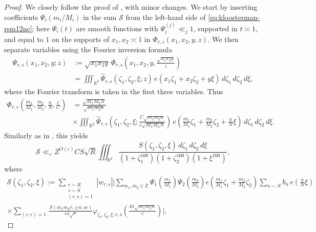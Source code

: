 \documentclass[reqno,11pt]{amsart}
\theoremstyle{remark}
\numberwithin{equation}{section}
\newcommand{\Z}{\mathbb{Z}}
\newcommand{\R}{\mathbb{R}}
\newcommand{\mS}{\mathcal{S}}
\newcommand{\eps}{\varepsilon}
\renewcommand{\bar}{\overline}
\renewcommand{\hat}{\widehat}
\begin{document}
\begin{proof}
We closely follow the proof of \cite[Corollary 17]{pascadi2023smooth}, with minor changes.
We start by inserting coefficients $\Psi_i(m_i/M_i)$ in the sum $\mS$ from the left-hand side of \cref{eq:kloosterman-rsm12nc}; here $\Psi_i(t)$ are smooth functions with $\Psi_i^{(j)} \ll_j 1$, supported in $t \asymp 1$, and equal to $1$ on the supports of $x_1, x_2 \asymp 1$ in $\Phi_{r,s}(x_1, x_2, y, z)$. We then separate variables using the Fourier inversion formula 
\[
\begin{aligned}
    \Psi_{r,s}(x_1, x_2, y; z)
    &:= 
    \sqrt{x_1 x_2 y}\,\Phi_{r,s}\left(x_1, x_2, y, \frac{\sqrt{x_1 x_2 y}}{z} \right) \\
    &= 
    \iiint_{\R^3} \hat{\Psi}_{r,s}(\zeta_1, \zeta_2, \xi; z) \, e(x_1\zeta_1 + x_2\zeta_2 + y\xi)\, d\zeta_1\, d\zeta_2\, d\xi,
\end{aligned}
\]
where the Fourier transform is taken in the first three variables. Thus
\[
\begin{aligned}
    \Phi_{r,s}\left(\frac{m_1}{M_1}, \frac{m_2}{M_2}, \frac{n}{N}, \frac{c}{C}\right)
    &=
    \frac{\sqrt{M_1M_2N}}{\sqrt{m_1m_2n}}
    \\
    &\times 
    \iiint_{\R^2} \hat{\Psi}_{r,s}\left(\zeta_1, \zeta_2, \xi; \frac{C\sqrt{m_1m_2n}}{c\sqrt{M_1M_2N}}\right) \, e\left(\frac{m_1}{M_1}\zeta_1 + \frac{m_2}{M_2}\zeta_2 + \frac{n}{N}\xi\right)\, d\zeta_1\, d\zeta_2\, d\xi.
\end{aligned}
\]
Similarly as in \cite[(5.21)]{pascadi2024large}, this yields
\begin{equation} \label{eq:final-kloosterman-integral}
    \mS \ll_\eps Z^{O(\eps)} CS\sqrt{R} \iiint_{\R^2} \frac{S(\zeta_1, \zeta_2, \xi)\, d\zeta_1\, d\zeta_2\, d\xi}{(1 + \zeta_1^{100}) (1 + \zeta_2^{100}) (1 + \xi^{100})},
\end{equation}
where
\[
\begin{aligned}
    \mS(\zeta_1, \zeta_2, \xi) := \sum_{\substack{r \sim R \\ s \sim S \\ (r, s) = 1}} |w_{r,s}| \Bigg\vert \sum_{m_1, m_2 \in \Z} \Psi_1\left(\frac{m_1}{M_1}\right) \Psi_2\left(\frac{m_2}{M_2}\right) e\left(\frac{m_1}{M_1}\zeta_1 + \frac{m_2}{M_2}\zeta_2\right) \sum_{n \sim N} b_n\, e\left(\frac{n}{N}\xi\right) 
    \\
    \times \sum_{(c, r) = 1}\,
    \frac{S(m_1 m_2 \bar{r}, \pm n; sc)}{cs\sqrt{r}} 
    \varphi_{\zeta_1,\zeta_2,\xi,r,s}\left(\frac{4\pi \sqrt{m_1 m_2 n}}{c}\right) \Bigg\vert,

\end{aligned}\]
\end{proof}
\end{document}
